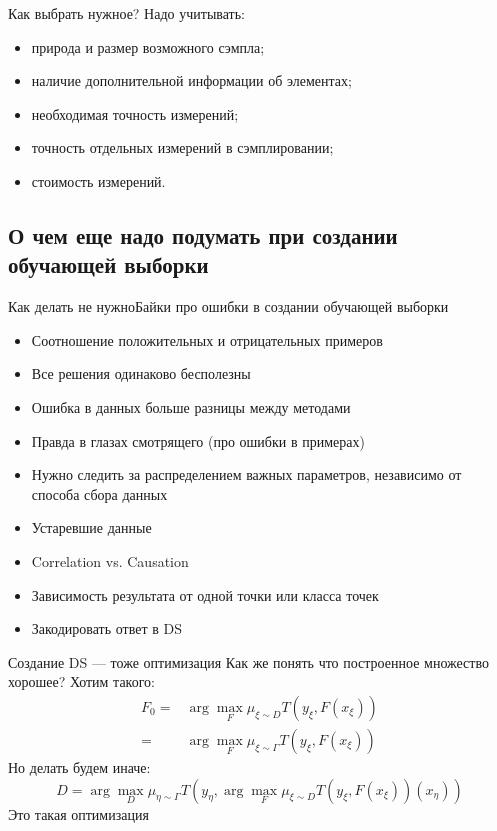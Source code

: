 \documentclass[14pt, fleqn, xcolor={dvipsnames, table}]{beamer}
\begin{document}
\begin{frame}{Как выбрать нужное?}
Надо учитывать:
\begin{itemize}
   \item природа и размер возможного сэмпла;
   \item наличие дополнительной информации об элементах;
   \item необходимая точность измерений;
   \item точность отдельных измерений в сэмплировании;
   \item стоимость измерений.
\end{itemize}
\end{frame}

\subsection{О чем еще надо подумать при создании обучающей выборки}
\begin{frame}{Как делать не нужно}{Байки про ошибки в создании обучающей выборки}
\small
\begin{itemize}
  \item Соотношение положительных и отрицательных примеров %
  \item Все решения одинаково бесполезны %
  \item Ошибка в данных больше разницы между методами %
  \item Правда в глазах смотрящего (про ошибки в примерах) %
  \item Нужно следить за распределением важных параметров, независимо от способа сбора данных %
  \item Устаревшие данные %
  \item Correlation vs. Causation %
  \item Зависимость результата от одной точки или класса точек %
  \item Закодировать ответ в DS %
\end{itemize}
\end{frame}

\begin{frame}{Создание DS --- тоже оптимизация}
\small
Как же понять что построенное множество хорошее? Хотим такого:
$$\begin{array}{rl}
F_0 =& \arg \max_{F} \mu_{\xi \sim D} T(y_{\xi}, F(x_{\xi})) \\
    =& \arg \max_{F} \mu_{\xi \sim \Gamma} T(y_{\xi}, F(x_{\xi}))
\end{array}$$
Но делать будем иначе:
$$
D = \arg \max_{D} \mu_{\eta \sim \Gamma} T(y_{\eta}, \arg \max_{F} \mu_{\xi \sim D} T(y_{\xi}, F(x_{\xi}))(x_\eta))
$$
Это такая оптимизация
\end{frame}
\end{document}
